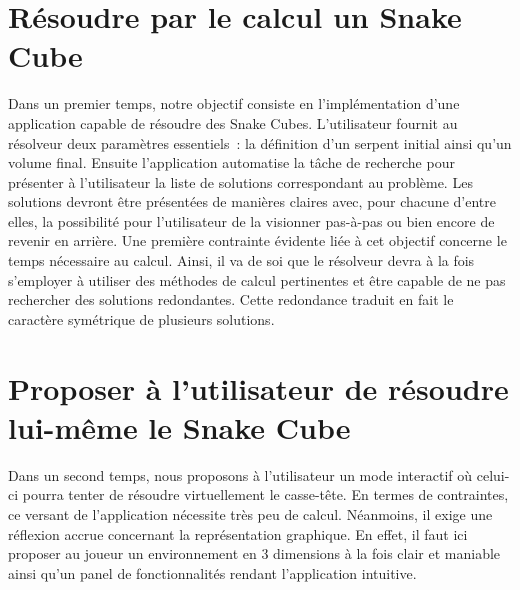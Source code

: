 \section{Résoudre par le calcul un Snake Cube}
Dans un premier temps, notre objectif consiste en l’implémentation d’une application capable de résoudre des Snake Cubes. L’utilisateur fournit au résolveur deux paramètres essentiels : la définition d’un serpent initial ainsi qu’un volume final. Ensuite l’application automatise la tâche de recherche pour présenter à l’utilisateur la liste de solutions correspondant au problème. Les solutions devront être présentées de manières claires avec, pour chacune d’entre elles, la possibilité pour l’utilisateur de la visionner pas-à-pas ou bien encore de revenir en arrière. Une première contrainte évidente liée à cet objectif concerne le temps nécessaire au calcul. Ainsi, il va de soi que le résolveur devra à la fois s’employer à utiliser des méthodes de calcul pertinentes et être capable de ne pas rechercher des solutions redondantes. Cette redondance traduit en fait le caractère symétrique de plusieurs solutions. 

\section{Proposer à l'utilisateur de résoudre lui-même le Snake Cube}
Dans un second temps, nous proposons à l’utilisateur un mode interactif où celui-ci pourra tenter de résoudre virtuellement le casse-tête. En termes de contraintes, ce versant de l’application nécessite très peu de calcul. Néanmoins, il exige une réflexion accrue concernant la représentation graphique. En effet, il faut ici proposer au joueur un environnement en 3 dimensions à la fois clair et maniable ainsi qu’un panel de fonctionnalités rendant l’application intuitive.